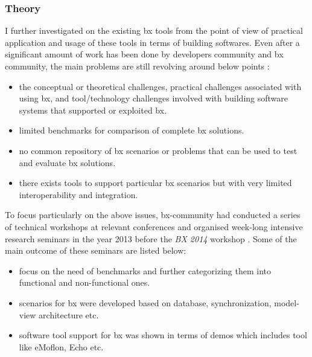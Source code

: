 \subsubsection{Theory}\label{subsubsec:bxtooltheory}
I further investigated on the existing bx tools from the point of view of practical application and usage of these tools in terms of building softwares. Even after a significant amount of work has been done by developers community and bx community, the main problems are still revolving around below points \cite{bx-theoryandappl}: 
\begin{itemize}
	\item {the conceptual or theoretical challenges, practical challenges associated with using bx, and tool/technology challenges involved with building software systems that supported or exploited bx.}
	\item {limited benchmarks for comparison of complete bx solutions.}
	\item {no common repository of bx scenarios or problems that can be used to test and evaluate bx solutions.}
	\item {there exists tools to support particular bx scenarios but with very limited interoperability and integration.}
\end{itemize}
To focus particularly on the above issues, bx-community had conducted a series of technical workshops at relevant conferences and organised week-long intensive research seminars in the year 2013 before the \textit{BX 2014} workshop \cite{bx-theoryandappl}. Some of the main outcome of these seminars are listed below:
\begin{itemize}
	\item {focus on the need of benchmarks and further categorizing them into functional and non-functional ones.}
	\item {scenarios for bx were developed based on database, synchronization, model-view architecture etc.}
	\item {software tool support for bx was shown in terms of demos which includes tool like eMoflon, Echo etc.}
\end{itemize}
